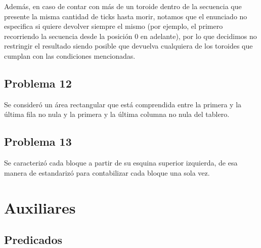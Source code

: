 \documentclass[a4paper]{article}
\begin{document}
	        Además, en caso de contar con más de un toroide dentro de la secuencia que presente la misma cantidad de ticks hasta morir, notamos que el enunciado no especifica si quiere devolver siempre el mismo (por ejemplo, el primero recorriendo la secuencia desde la posición 0 en adelante), por lo que decidimos no restringir el resultado siendo posible que devuelva cualquiera de los toroides que cumplan con las condiciones mencionadas.
	    
	    \subsection{Problema 12}
	    
	        Se consideró un área rectangular que está comprendida entre la primera y la última fila no nula y la primera y la última columna no nula del tablero. 
	        
	    \subsection{Problema 13}
	        
	        Se caracterizó cada bloque a partir de su esquina superior izquierda, de esa manera de estandarizó para contabilizar cada bloque una sola vez. 
	    
    	    \newpage
	
	\section{Auxiliares}
	
    	\subsection{Predicados} \vspace{1em}
	
        	 \\
        	
        	 \\
        	
	         \\
	        
	         \\
        	
\end{document}
